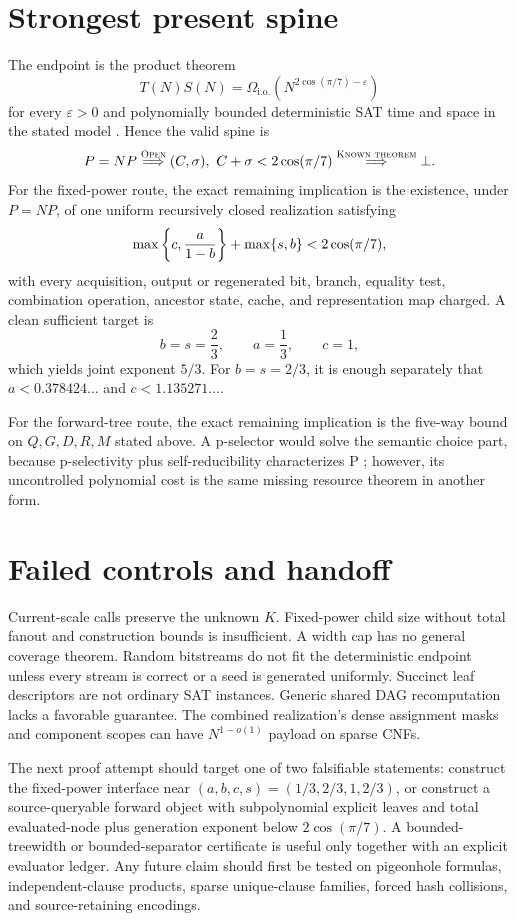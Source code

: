 \documentclass[11pt]{article}
\newcommand{\gammaTS}{2\cos(\pi/7)}
\begin{document}
\section{Strongest present spine}
The endpoint is the product theorem
\[
 T(N)S(N)=\Omega_{\mathrm{i.o.}}
 \left(N^{\gammaTS-\varepsilon}\right)
\]
for every $\varepsilon>0$ and polynomially bounded deterministic SAT time
and space in the stated model \cite{williams2010}.  Hence the valid spine is
\[
 P=NP
 \overset{\textsc{Open}}{\Longrightarrow}
 (C,\sigma),\ C+\sigma<\gammaTS
 \overset{\textsc{Known theorem}}{\Longrightarrow}\bot.
\]
For the fixed-power route, the exact remaining implication is the existence,
under $P=NP$, of one uniform recursively closed realization satisfying
\[
 \max\left\{c,{a\over1-b}\right\}+\max\{s,b\}<\gammaTS,
\]
with every acquisition, output or regenerated bit, branch, equality test,
combination operation, ancestor state, cache, and representation map charged.
A clean sufficient target is
\[
 b=s=\frac23,\qquad a=\frac13,\qquad c=1,
\]
which yields joint exponent $5/3$.  For $b=s=2/3$, it is enough separately
that $a<0.378424\ldots$ and $c<1.135271\ldots$.

For the forward-tree route, the exact remaining implication is the five-way
bound on $Q,G,D,R,M$ stated above.  A p-selector would solve the semantic
choice part, because p-selectivity plus self-reducibility characterizes P
\cite{buhrmantorenvliet}; however, its uncontrolled polynomial cost is the
same missing resource theorem in another form.

\section{Failed controls and handoff}
Current-scale calls preserve the unknown $K$.  Fixed-power child size without
total fanout and construction bounds is insufficient.  A width cap has no
general coverage theorem.  Random bitstreams do not fit the deterministic
endpoint unless every stream is correct or a seed is generated uniformly.
Succinct leaf descriptors are not ordinary SAT instances.  Generic shared
DAG recomputation lacks a favorable guarantee.  The combined realization's
dense assignment masks and component scopes can have $N^{1-o(1)}$ payload on
sparse CNFs.

The next proof attempt should target one of two falsifiable statements:
construct the fixed-power interface near $(a,b,c,s)=(1/3,2/3,1,2/3)$, or
construct a source-queryable forward object with subpolynomial explicit
leaves and total evaluated-node plus generation exponent below $\gammaTS$.
A bounded-treewidth or bounded-separator certificate is useful only together
with an explicit evaluator ledger.  Any future claim should first be tested
on pigeonhole formulas, independent-clause products, sparse unique-clause
families, forced hash collisions, and source-retaining encodings.
\end{document}

